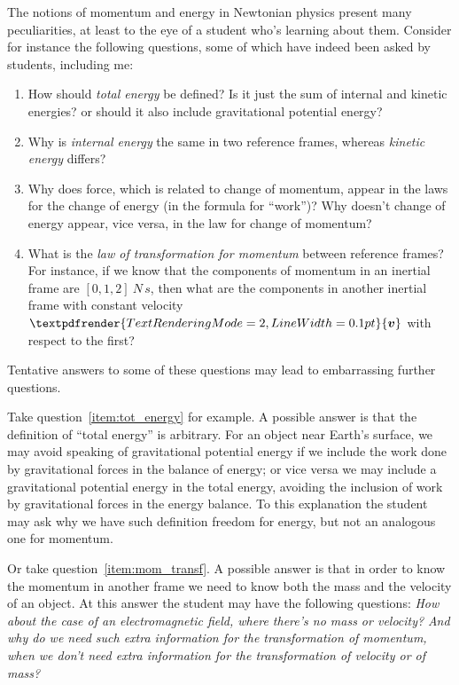 \documentclass[\ifafour a4paper,12pt,\else a5paper,10pt,\fi%
onecolumn,oneside,article,%
british%
]{memoir}
\renewcommand*{\bm}[1]{\textpdfrender{TextRenderingMode=2,LineWidth=0.1pt}{\boldsymbol{#1}}}
\renewcommand*{\|}[1][]{\nonscript\:#1\vert\nonscript\:\mathopen{}}
\begin{document}
The notions of momentum and energy in Newtonian physics present many peculiarities, at least to the eye of a student who's learning about them. %
Consider for instance the following questions, some of which have indeed been asked by students, including me:
\begin{enumerate}
\item\label{item:tot_energy} How should \emph{total energy} be defined? Is it just the sum of internal and kinetic energies? or should it also include gravitational potential energy?
\item\label{item:internalenergy_invariant} Why is \emph{internal energy} the same in two reference frames, whereas \emph{kinetic energy} differs?
\item\label{item:force_energyflux} Why does force, which is related to change of momentum, appear in the laws for the change of energy (in the formula for \enquote{work})? Why doesn't change of energy appear, vice versa, in the law for change of momentum?
\item\label{item:mom_transf} What is the \emph{law of transformation for momentum} between reference frames? For instance, if we know that the components of momentum in an inertial frame are $[0,1,2]\:\unit{N\,s}$, then what are the components in another inertial frame with constant velocity $\bm{v}$ with respect to the first?
\end{enumerate}

Tentative answers to some of these questions may lead to embarrassing further questions.

Take question~\ref{item:tot_energy} for example. A possible answer is that the definition of \enquote{total energy} is arbitrary. For an object near Earth's surface, we may avoid speaking of gravitational potential energy if we include the work done by gravitational forces in the balance of energy; or vice versa we may include a gravitational potential energy in the total energy, avoiding the inclusion of work by gravitational forces in the energy balance. To this explanation the student may ask why we have such definition freedom for energy, but not an analogous one for momentum.

Or take question~\ref{item:mom_transf}. A possible answer is that in order to know the momentum in another frame we need to know both the mass and the velocity of an object. At this answer the student may have the following questions: \emph{How about the case of an electromagnetic field, where there's no mass or velocity?} \emph{And why do we need such extra information for the transformation of momentum, when we don't need extra information for the transformation of velocity or of mass?}
\end{document}
